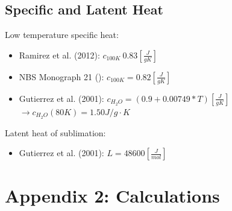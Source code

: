 \documentclass[11pt]{article} %
\begin{document}
\subsection{Specific  and Latent Heat}
\label{sec:sheat}

	Low temperature specific heat:
	
	\begin{itemize}
	\item Ramirez et al. (2012): $c_{100 K} ~ 0.83 [\frac{J}{g K}]$
	\item NBS Monograph 21 (): $c_{100 K} = 0.82 [\frac{J}{g K}]$
	\item Gutierrez et al. (2001): $c_{H_{2}O} = (0.9 + 0.00749 * T) [\frac{J}{g K}]$
		$\rightarrow c_{H_{2}O}(80K) = 1.50 J/g\cdot K$
	\end{itemize}
	
	Latent heat of sublimation:
	
	\begin{itemize}
	\item Gutierrez et al. (2001): $L = 48600 [\frac{J}{mol}]$
	\end{itemize}

\section{Appendix 2: Calculations}
\end{document}
